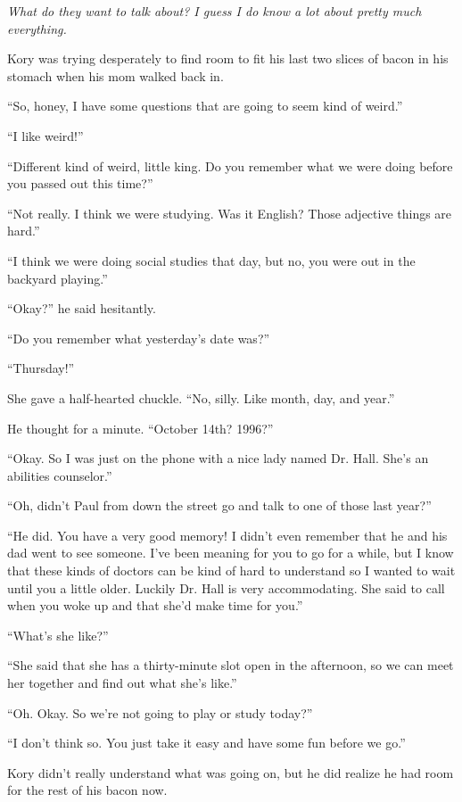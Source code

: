 \textit{What do they want to talk about? I guess I do know a lot about pretty much everything.}

Kory was trying desperately to find room to fit his last two slices of bacon in his stomach when his mom walked back in.

``So, honey, I have some questions that are going to seem kind of weird.''

``I like weird!''

``Different kind of weird, little king. Do you remember what we were doing before you passed out this time?''

``Not really. I think we were studying. Was it English? Those adjective things are hard.''

``I think we were doing social studies that day, but no, you were out in the backyard playing.''

``Okay?'' he said hesitantly.

``Do you remember what yesterday's date was?''

``Thursday!''

She gave a half-hearted chuckle. ``No, silly. Like month, day, and year.''

He thought for a minute. ``October 14th? 1996?''

``Okay. So I was just on the phone with a nice lady named Dr. Hall. She's an abilities counselor.''

``Oh, didn't Paul from down the street go and talk to one of those last year?''

``He did. You have a very good memory! I didn't even remember that he and his dad went to see someone. I've been meaning for you to go for a while, but I know that these kinds of doctors can be kind of hard to understand so I wanted to wait until you a little older. Luckily Dr. Hall is very accommodating. She said to call when you woke up and that she'd make time for you.''

``What's she like?''

``She said that she has a thirty-minute slot open in the afternoon, so we can meet her together and find out what she's like.''

``Oh. Okay. So we're not going to play or study today?''

``I don't think so. You just take it easy and have some fun before we go.''

Kory didn't really understand what was going on, but he did realize he had room for the rest of his bacon now.

\line

